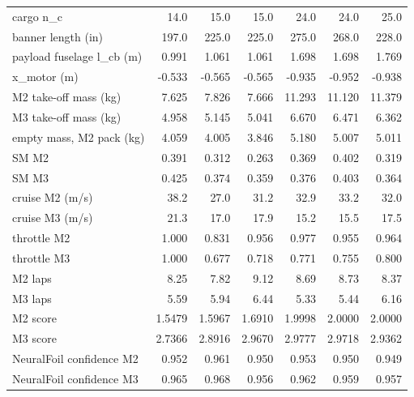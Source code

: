 \begin{table}[htbp]
{\begin{tabular}{lrrrrrr}
cargo n\_c & 14.0 & 15.0 & 15.0 & 24.0 & 24.0 & 25.0 \\
banner length (in) & 197.0 & 225.0 & 225.0 & 275.0 & 268.0 & 228.0 \\
payload fuselage l\_cb (m) & 0.991 & 1.061 & 1.061 & 1.698 & 1.698 & 1.769 \\
x\_motor (m) & -0.533 & -0.565 & -0.565 & -0.935 & -0.952 & -0.938 \\
M2 take-off mass (kg) & 7.625 & 7.826 & 7.666 & 11.293 & 11.120 & 11.379 \\
M3 take-off mass (kg) & 4.958 & 5.145 & 5.041 & 6.670 & 6.471 & 6.362 \\
empty mass, M2 pack (kg) & 4.059 & 4.005 & 3.846 & 5.180 & 5.007 & 5.011 \\
SM M2 & 0.391 & 0.312 & 0.263 & 0.369 & 0.402 & 0.319 \\
SM M3 & 0.425 & 0.374 & 0.359 & 0.376 & 0.403 & 0.364 \\
cruise M2 (m/s) & 38.2 & 27.0 & 31.2 & 32.9 & 33.2 & 32.0 \\
cruise M3 (m/s) & 21.3 & 17.0 & 17.9 & 15.2 & 15.5 & 17.5 \\
throttle M2 & 1.000 & 0.831 & 0.956 & 0.977 & 0.955 & 0.964 \\
throttle M3 & 1.000 & 0.677 & 0.718 & 0.771 & 0.755 & 0.800 \\
M2 laps & 8.25 & 7.82 & 9.12 & 8.69 & 8.73 & 8.37 \\
M3 laps & 5.59 & 5.94 & 6.44 & 5.33 & 5.44 & 6.16 \\
M2 score & 1.5479 & 1.5967 & 1.6910 & 1.9998 & 2.0000 & 2.0000 \\
M3 score & 2.7366 & 2.8916 & 2.9670 & 2.9777 & 2.9718 & 2.9362 \\
NeuralFoil confidence M2 & 0.952 & 0.961 & 0.950 & 0.953 & 0.950 & 0.949 \\
NeuralFoil confidence M3 & 0.965 & 0.968 & 0.956 & 0.962 & 0.959 & 0.957 \\
\bottomrule
\end{tabular}}
\end{table}
